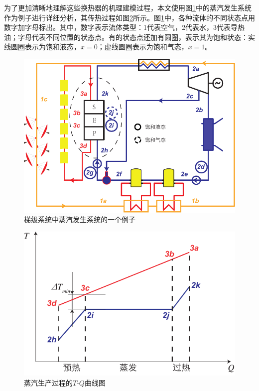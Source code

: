 为了更加清晰地理解这些换热器的机理建模过程，本文使用图\ref{fig:PES}中的蒸汽发生系统作为例子进行详细分析，其传热过程如图\ref{fig:PES_TQ}所示。图\ref{fig:PES}中，各种流体的不同状态点用数字加字母标出。其中，数字表示流体类型：1代表空气，2代表水，3代表导热油；字母代表不同位置的状态点。有的状态点还加有圆圈，表示其为饱和状态：实线圆圈表示为饱和液态，$x = 0$；虚线圆圈表示为饱和气态，$x = 1$。


\noindent \begin{figure}[!ht]
\begin{center}
	\includegraphics[width = 0.8\columnwidth]{fig/PES}
	\caption{梯级系统中蒸汽发生系统的一个例子}
	\label{fig:PES}
\end{center}
\end{figure}

\noindent \begin{figure}[htbp]
\begin{center}
	\includegraphics[width = 0.5\columnwidth]{fig/PES_TQ}
	\caption{蒸汽生产过程的$T$-$Q$曲线图}
	\label{fig:PES_TQ}
\end{center}
\end{figure}

